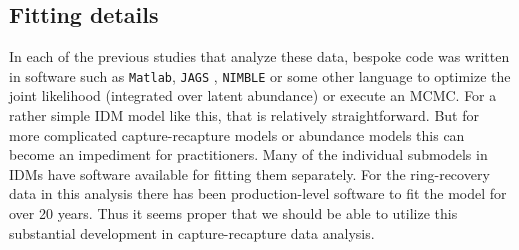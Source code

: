 \documentclass[12pt]{article}
\begin{document}
\subsection{Fitting details}
 
In each of the previous studies that analyze these data, bespoke code was written in software such as {\tt Matlab}, {\tt JAGS} \citep{plummer2003jags}, {\tt NIMBLE} \citep{de2017programming} or some other language to optimize the joint likelihood (integrated over latent abundance) or execute an MCMC. For a rather simple IDM model like this, that is relatively straightforward. But for more complicated capture-recapture models or abundance  models this can become an impediment for practitioners. Many of the individual submodels in IDMs have software available for fitting them separately. For the ring-recovery data in this analysis there has been production-level software to fit the model for over 20 years. Thus it seems proper that we should be able to utilize this substantial development in capture-recapture data analysis. 
\end{document}
